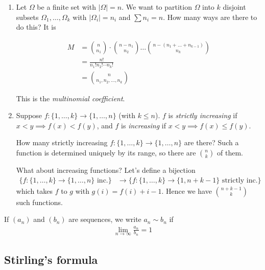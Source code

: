 \documentclass{../../template/note}
\begin{document}
    \begin{enumerate}
        \item Let \(\Omega\) be a finite set with \(| \Omega|  = n\). We want to partition \(\Omega\) into \(k\) disjoint subsets \(\Omega_1, \dots, \Omega_k\) with \(| \Omega_i|  = n_i\) and \(\sum n_i = n\). How many ways are there to do this? It is

        \begin{align*}
            M &= \binom n {n_1} \cdot \binom {n-n_1} {n_2} \dots \binom{n-(n_1 + \dots + n_{k-1})}{n_k} \\
            &= \frac{n!}{n_1!n_2! \cdots n_k!} \\
            &= \binom{n}{n_1, n_2, \dots, n_k}
        \end{align*}
        
        This is the \emph{multinomial coefficient}.

        \item Suppose \(f: \{1, \dots, k\} \to \{1, \dots, n\}\) (with \(k \leq n\)). \(f\) is \emph{strictly increasing} if \(x < y \implies f(x) < f(y)\), and \(f\) is \emph{increasing} if \(x < y \implies f(x) \leq f(y)\).
        
        How many strictly increasing \(f: \{1, \dots, k\} \to \{1, \dots, n\}\) are there? Such a function is determined uniquely by its range, so there are \(\binom n k\) of them.

        What about increasing functions? Let's define a bijection
        \begin{align*}
            \{f: \{1, \dots, k\} \to \{1, \dots, n\}\text{ inc.}\} &\to \{f: \{1, \dots, k\} \to \{1, n+k-1\} \text{ strictly inc.}\}
        \end{align*}
        which takes \(f\) to \(g\) with \(g(i) = f(i) + i - 1\). Hence we have \(\binom{n+k-1}{k}\) such functions.
    \end{enumerate}

    \begin{definition}
        If \((a_n)\) and \((b_n)\) are sequences, we write \(a_n \sim b_n\) if
        \begin{align*}
            \lim_{n \to \infty} \frac{a_n}{b_n} = 1
        \end{align*}
    \end{definition}
    
    \subsection{Stirling's formula}
    
\end{document}
